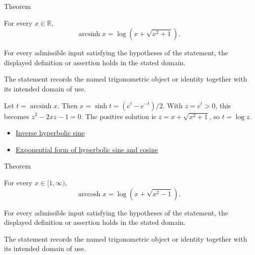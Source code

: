 \begin{theorembox}{Theorem}
\begin{theorem}
\label{thm:inverse-hyperbolic-sine-log-form}
For every $x\in\mathbb{R}$,
\[
  \operatorname{arcsinh} x=\log\!\left(x+\sqrt{x^2+1}\right).
\]
\end{theorem}
\end{theorembox}
\begin{remark*}
For every admissible input satisfying the hypotheses of the statement, the
displayed definition or assertion holds in the stated domain.
\end{remark*}

\begin{remark*}[Interpretation]
The statement records the named trigonometric object or identity together with
its intended domain of use.
\end{remark*}

\begin{remark*}[Proof]
Let $t=\operatorname{arcsinh}x$. Then $x=\sinh t=(e^t-e^{-t})/2$. With
$z=e^t>0$, this becomes $z^2-2xz-1=0$. The positive solution is
$z=x+\sqrt{x^2+1}$, so $t=\log z$.
\end{remark*}
\begin{dependencies}
\begin{itemize}
  \item \hyperref[def:inverse-hyperbolic-sine]{Inverse hyperbolic sine}
  \item \hyperref[thm:hyperbolic-exponential-form]{Exponential form of hyperbolic sine and cosine}
\end{itemize}
\end{dependencies}

\begin{theorembox}{Theorem}
\begin{theorem}
\label{thm:inverse-hyperbolic-cosine-log-form}
For every $x\in[1,\infty)$,
\[
  \operatorname{arccosh} x=\log\!\left(x+\sqrt{x^2-1}\right).
\]
\end{theorem}
\end{theorembox}
\begin{remark*}
For every admissible input satisfying the hypotheses of the statement, the
displayed definition or assertion holds in the stated domain.
\end{remark*}

\begin{remark*}[Interpretation]
The statement records the named trigonometric object or identity together with
its intended domain of use.
\end{remark*}

